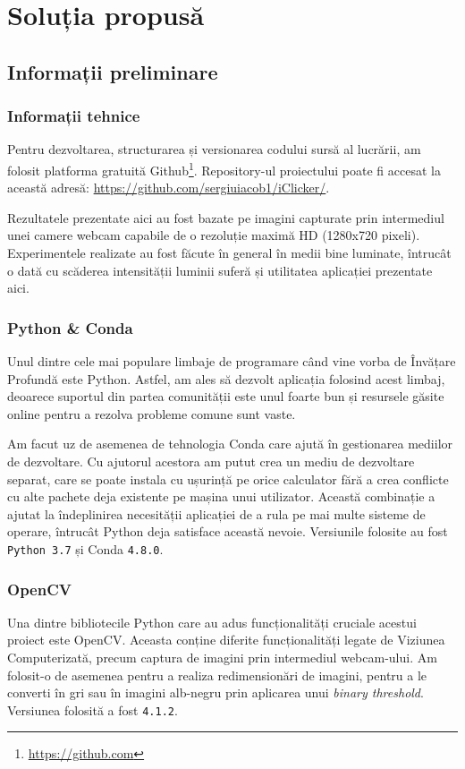\chapter{Soluția propusă}
\section{Informații preliminare}
\subsection{Informații tehnice}
Pentru dezvoltarea, structurarea și versionarea codului sursă al lucrării, am folosit platforma gratuită Github\footnote{\url{https://github.com}}.
Repository-ul proiectului poate fi accesat la această adresă: \url{https://github.com/sergiuiacob1/iClicker/}.

Rezultatele prezentate aici au fost bazate pe imagini capturate prin intermediul unei camere webcam capabile de o rezoluție maximă HD (1280x720 pixeli).
Experimentele realizate au fost făcute în general în medii bine luminate, întrucât o dată cu scăderea intensității luminii suferă și utilitatea aplicației prezentate aici.

\subsection{Python \& Conda}
Unul dintre cele mai populare limbaje de programare când vine vorba de Învățare Profundă este Python.
Astfel, am ales să dezvolt aplicația folosind acest limbaj, deoarece suportul din partea comunității este unul foarte bun și resursele găsite online pentru a rezolva probleme comune sunt vaste.

Am facut uz de asemenea de tehnologia Conda care ajută în gestionarea mediilor de dezvoltare.
Cu ajutorul acestora am putut crea un mediu de dezvoltare separat, care se poate instala cu ușurință pe orice calculator fără a crea conflicte cu alte pachete deja existente pe mașina unui utilizator.
Această combinație a ajutat la îndeplinirea necesității aplicației de a rula pe mai multe sisteme de operare, întrucât Python deja satisface această nevoie.
Versiunile folosite au fost \lstinline{Python 3.7} și Conda \lstinline{4.8.0}.

\subsection{OpenCV}
Una dintre bibliotecile Python care au adus funcționalități cruciale acestui proiect este OpenCV.
Aceasta conține diferite funcționalități legate de Viziunea Computerizată, precum captura de imagini prin intermediul webcam-ului.
Am folosit-o de asemenea pentru a realiza redimensionări de imagini, pentru a le converti în gri sau în imagini alb-negru prin aplicarea unui \emph{binary threshold}.
Versiunea folosită a fost \lstinline{4.1.2}.

